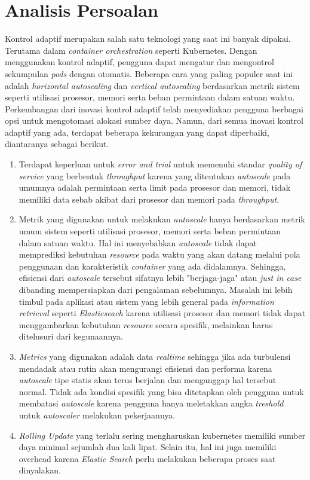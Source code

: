 \section{Analisis Persoalan}

Kontrol adaptif merupakan salah satu teknologi yang saat ini banyak dipakai. Terutama dalam \textit{container orchestration} seperti Kubernetes. Dengan menggunakan kontrol adaptif, pengguna dapat mengatur dan mengontrol sekumpulan \textit{pods} dengan otomatis. Beberapa cara yang paling populer saat ini adalah \textit{horizontal autoscaling} dan \textit{vertical autoscaling} berdasarkan metrik sistem seperti utilisasi prosesor, memori serta beban permintaan dalam satuan waktu. Perkembangan dari inovasi kontrol adaptif telah menyediakan pengguna berbagai opsi untuk mengotomasi alokasi sumber daya. Namun, dari semua inovasi kontrol adaptif yang ada, terdapat beberapa kekurangan yang dapat diperbaiki, diantaranya sebagai berikut.

\begin{enumerate}
    \item Terdapat keperluan untuk \textit{error and trial} untuk memenuhi standar \textit{quality of service} yang berbentuk \textit{throughput} karena yang ditentukan \textit{autoscale} pada umumnya adalah permintaan serta limit pada prosesor dan memori, tidak memiliki data sebab akibat dari prosesor dan memori pada \textit{throughput}.
    \item Metrik yang digunakan untuk melakukan \textit{autoscale} hanya berdasarkan metrik umum sistem seperti utilisasi prosesor, memori serta beban permintaan dalam satuan waktu. Hal ini menyebabkan \textit{autoscale} tidak dapat memprediksi kebutuhan \textit{resource} pada waktu yang akan datang melalui pola penggunaan dan karakteristik \textit{container} yang ada didalamnya. Sehingga, efisiensi dari \textit{autoscale} tersebut sifatnya lebih "berjaga-jaga" atau \textit{just in case} dibanding mempersiapkan dari pengalaman sebelumnya. Masalah ini lebih timbul pada aplikasi atau sistem yang lebih general pada \textit{information retrieval} seperti \textit{Elasticseach} karena utilisasi prosesor dan memori tidak dapat menggambarkan kebutuhan \textit{resource} secara spesifik, melainkan harus ditelusuri dari kegunaannya.
    \item \textit{Metrics} yang digunakan adalah data \textit{realtime} sehingga jika ada turbulensi mendadak atau rutin akan mengurangi efisiensi dan performa karena \textit{autoscale} tipe statis akan terus berjalan dan menganggap hal tersebut normal. Tidak ada kondisi spesifik yang bisa ditetapkan oleh pengguna untuk membatasi \textit{autoscale} karena pengguna hanya meletakkan angka \textit{treshold} untuk \textit{autoscaler} melakukan pekerjaannya.
    \item \textit{Rolling Update} yang terlalu sering mengharuskan kubernetes memiliki sumber daya minimal sejumlah dua kali lipat. Selain itu, hal ini juga memiliki overhead karena \textit{Elastic Search} perlu melakukan beberapa proses saat dinyalakan.
\end{enumerate}

